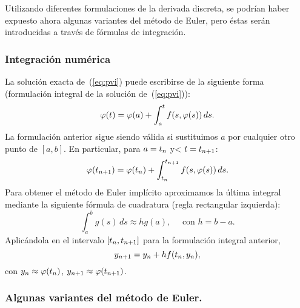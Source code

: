 Utilizando diferentes formulaciones de la derivada discreta, se podrían
haber expuesto ahora algunas variantes del método de Euler, pero éstas
serán introducidas a través de fórmulas de integración.

\subsubsection*{Integración numérica}
La solución exacta de~(\ref{eq:pvi}) puede escribirse de la siguiente
forma (formulación integral de la solución de~(\ref{eq:pvi})):
\begin{equation*}
  \varphi(t) = \varphi(a) + \int_a^t f(s,\varphi(s))\, ds.
\end{equation*}
La formulación anterior sigue siendo válida si sustituimos $a$ por cualquier otro punto de $[a,b]$. En particular, para
$a={t_n}$ y< $t={t_{n+1}}$:
\begin{equation}
  \label{eq:tema4.5}
  \varphi({t_{n+1}}) = \varphi({t_n}) + \int_{t_n}^{t_{n+1}} f(s,\varphi(s))\, ds.
\end{equation}
Para obtener el método de Euler implícito aproximamos la última
integral mediante la siguiente fórmula de cuadratura (regla
rectangular izquierda):
\begin{equation*}
  \int_a^b g(s)\,ds \approx hg(a), \quad \text{ con $h=b-a$}.
\end{equation*}
Aplicándola en el intervalo $[{t_n},{t_{n+1}}]$ para la formulación integral
anterior,
\begin{equation*}
  {y_{n+1}} =  {y_n} + h f({t_n},{y_n}),
\end{equation*}
con ${y_n}\approx\varphi({t_n})$, ${y_{n+1}}\approx\varphi({t_{n+1}})$.

\subsubsection*{Algunas variantes del método de Euler.}

